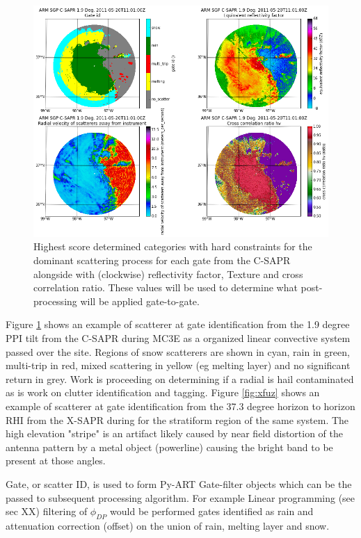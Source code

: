\documentclass[twocol]{ametsoc}
\begin{document}
\begin{figure}[h]
    \centering
    \includegraphics[width=0.95\columnwidth]{flog.png}
    \caption{Highest score determined categories with hard constraints for the dominant scattering process for each gate from the C-SAPR alongside with (clockwise) reflectivity factor,
    Texture and cross correlation ratio. These values will be used to determine what post-processing will  be applied gate-to-gate.  }
    \label{fig:flog}
\end{figure}

Figure \ref{fig:flog} shows an example of scatterer at gate identification from the 1.9 degree PPI tilt from the C-SAPR during MC3E as a organized linear convective system passed over the site. 
Regions of snow scatterers are shown in cyan, rain in green, multi-trip in red, mixed scattering in yellow (eg melting layer) and no significant return in grey. Work is proceeding on determining if 
a radial is hail contaminated as is work on clutter identification and tagging.  Figure \ref{fig:xfuz} shows an example of scatterer at gate identification from the 37.3 degree horizon to horizon 
RHI from the X-SAPR during for the stratiform region of the same system. The high elevation "stripe" is an artifact likely caused by near field distortion of the antenna pattern by a metal object
(powerline) causing the bright band to be present at those angles. 

Gate, or scatter ID, is used to form Py-ART Gate-filter objects which can be the passed to subsequent processing algorithm. For example Linear programming (see sec XX) filtering of $\phi_{DP}$ 
would be performed gates identified as rain and attenuation correction (offset) on the union of rain, melting layer and snow. 
\end{document}
